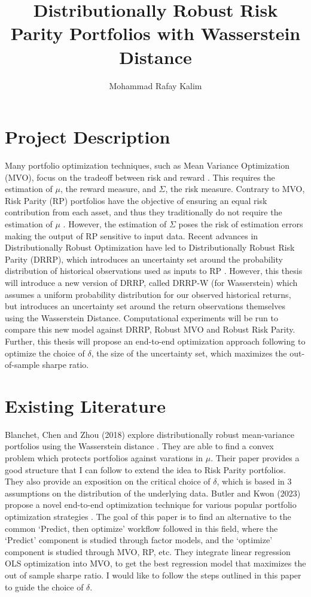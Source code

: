 \documentclass[12pt]{article}
\title{Distributionally Robust Risk Parity Portfolios with Wasserstein Distance}
\author{Mohammad Rafay Kalim }
\date{\vspace{-5ex}}
\begin{document}
\maketitle

\section{Project Description}
Many portfolio optimization techniques, such as Mean Variance Optimization (MVO), focus on the tradeoff between risk and reward \cite{markowitz1952}. This requires the estimation of $\mu$, the reward measure, and $\Sigma$, the risk measure.  Contrary to MVO, Risk Parity (RP) portfolios have the objective of ensuring an equal risk contribution from each asset, and thus they traditionally do not require the estimation of $\mu$ \cite{qian2011risk}.  However, the estimation of $\Sigma$ poses the risk of estimation errors making the output of RP sensitive to input data. Recent advances in Distributionally Robust Optimization have led to Distributionally Robust Risk Parity (DRRP), which introduces an uncertainty set around the probability distribution of historical observations used as inputs to RP \cite{costa2020robust}.  However, this thesis will introduce a new version of DRRP, called DRRP-W (for Wasserstein) which assumes a uniform probability distribution for our observed historical returns, but introduces an uncertainty set around the return observations themselves using the Wasserstein Distance.  Computational experiments will be run to compare this new model against DRRP, Robust MVO and Robust Risk Parity. Further, this thesis will propose an end-to-end optimization approach following \cite{butler2023integrating} to optimize the choice of $\delta$, the size of the uncertainty set, which maximizes the out-of-sample sharpe ratio.

\section{Existing Literature}
Blanchet, Chen and Zhou (2018) explore distributionally robust mean-variance portfolios using the Wasserstein distance \cite{blanchet2022distributionally}. They are able to find a convex problem which protects portfolios against varations in $\mu$.  Their paper provides a good structure that I can follow to extend the idea to Risk Parity portfolios.  They also provide an exposition on the critical choice of $\delta$, which is based in 3 assumptions on the distribution of the underlying data.  Butler and Kwon (2023) propose a novel end-to-end optimization technique for various popular portfolio optimization strategies \cite{butler2023integrating}. The goal of this paper is to find an alternative to the common `Predict, then optimize' workflow followed in this field, where the `Predict' component is studied through factor models, and the `optimize' component is studied through MVO, RP, etc. They integrate linear regression OLS optimization into MVO, to get the best regression model that maximizes the out of sample sharpe ratio.  I would like to follow the steps outlined in this paper to guide the choice of $\delta$.
\end{document}

